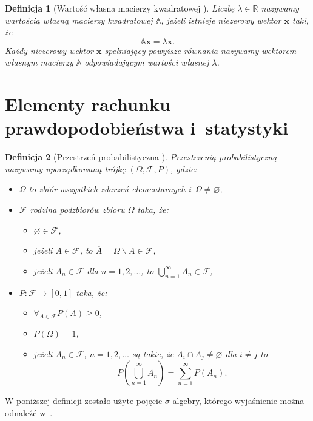 \documentclass[12pt,a4paper]{report}
\newtheorem{df}{Definicja}[chapter]
\newcommand{\setR}{\mathbb{R}}
\begin{document}
\begin{df}[Wartość własna macierzy kwadratowej {\citep[Sec 12.2]{alzega}}]
Liczbę $\lambda \in \setR$ nazywamy wartością własną macierzy kwadratowej $\mathbb{A}$, jeżeli istnieje niezerowy wektor $\mathbf{x}$ taki, że
$$
\mathbb{A}\mathbf{x}=\lambda\mathbf{x}.
$$
Każdy niezerowy wektor $\mathbf{x}$ spełniający powyższe równania nazywamy wektorem własnym macierzy $\mathbb{A}$ odpowiadającym wartości własnej $\lambda$.
\end{df}


\section{Elementy rachunku prawdopodobieństwa i~statystyki}

\begin{df}[Przestrzeń probabilistyczna {\citep[Sec 1.2, Sec 1.4]{wztp}}]
Przestrzenią probabilistyczną nazywamy uporządkowaną trójkę $(\Omega, \mathcal{F}, P)$, gdzie:
\begin{itemize}
\item $\Omega$ to zbiór wszystkich zdarzeń elementarnych i~$\Omega \neq \varnothing$,
\item $ \mathcal{F} $ rodzina podzbiorów zbioru $\Omega$ taka, że:
\begin{itemize}
\item $\varnothing \in \mathcal{F} $,
\item jeżeli $ \mathit{A} \in \mathcal{F}$, to $\overline{\mathit{A}} = \Omega \backslash \mathit{A} \in \mathcal{F}$,
\item jeżeli $ \mathit{A}_n \in \mathcal{F}$ dla $n=1,2,\ldots$, to $\bigcup_{n=1}^{\infty} \mathit{A}_n \in \mathcal{F}$,
\end{itemize}
\item $P : \mathcal{F} \to [0,1]$ taka, że:
\begin{itemize}
\item $\forall_{\mathit{A} \in \mathcal{F}} P(\mathit{A}) \geq 0$,
\item $P(\Omega) = 1$,
\item jeżeli $ \mathit{A}_n \in \mathcal{F}$, $n=1,2,\ldots$ są takie, że $\mathit{A}_i \cap \mathit{A}_j \neq \varnothing$ dla $i \neq j$ to
$$
P(\bigcup_{n=1}^{\infty} \mathit{A}_n) = \sum_{n=1}^{\infty} P(\mathit{A}_n).
$$
\end{itemize}
\end{itemize}
\end{df}

W poniższej definicji zostało użyte pojęcie $\sigma$-algebry, którego wyjaśnienie można odnaleźć w~{\citep[Sec 1.2 Def. 1.2]{wztp}}.
\end{document}
